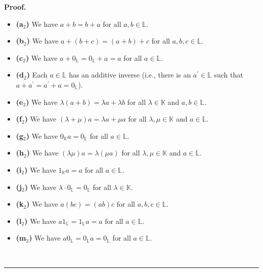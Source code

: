 \documentclass[numbers=enddot,12pt,final,onecolumn,notitlepage]{scrartcl}%
\theoremstyle{definition}
\newenvironment{fineprint}{\begin{small}}{\end{small}}
\newenvironment{proof}[1][Proof]{\noindent\textbf{#1.} }{\ \rule{0.5em}{0.5em}}
\begin{document}
\begin{fineprint}
\begin{proof}
\begin{itemize}
\item \textbf{(a}$_{2}$\textbf{)} We have $a+b=b+a$ for all $a,b\in\mathbb{L}$.

\item \textbf{(b}$_{2}$\textbf{)} We have $a+\left(  b+c\right)  =\left(
a+b\right)  +c$ for all $a,b,c\in\mathbb{L}$.

\item \textbf{(c}$_{2}$\textbf{)} We have $a+0_{\mathbb{L}}=0_{\mathbb{L}%
}+a=a$ for all $a\in\mathbb{L}$.

\item \textbf{(d}$_{2}$\textbf{)} Each $a\in\mathbb{L}$ has an additive
inverse (i.e., there is an $a^{\prime}\in\mathbb{L}$ such that $a+a^{\prime
}=a^{\prime}+a=0_{\mathbb{L}}$).

\item \textbf{(e}$_{2}$\textbf{)} We have $\lambda\left(  a+b\right)  =\lambda
a+\lambda b$ for all $\lambda\in\mathbb{K}$ and $a,b\in\mathbb{L}$.

\item \textbf{(f}$_{2}$\textbf{)} We have $\left(  \lambda+\mu\right)
a=\lambda a+\mu a$ for all $\lambda,\mu\in\mathbb{K}$ and $a\in\mathbb{L}$.

\item \textbf{(g}$_{2}$\textbf{)} We have $0_{\mathbb{K}}a=0_{\mathbb{L}}$ for
all $a\in\mathbb{L}$.

\item \textbf{(h}$_{2}$\textbf{)} We have $\left(  \lambda\mu\right)
a=\lambda\left(  \mu a\right)  $ for all $\lambda,\mu\in\mathbb{K}$ and
$a\in\mathbb{L}$.

\item \textbf{(i}$_{2}$\textbf{)} We have $1_{\mathbb{K}}a=a$ for all
$a\in\mathbb{L}$.

\item \textbf{(j}$_{2}$\textbf{)} We have $\lambda\cdot0_{\mathbb{L}%
}=0_{\mathbb{L}}$ for all $\lambda\in\mathbb{K}$.

\item \textbf{(k}$_{2}$\textbf{)} We have $a\left(  bc\right)  =\left(
ab\right)  c$ for all $a,b,c\in\mathbb{L}$.

\item \textbf{(l}$_{2}$\textbf{)} We have $a1_{\mathbb{L}}=1_{\mathbb{L}}a=a$
for all $a\in\mathbb{L}$.

\item \textbf{(m}$_{2}$\textbf{)} We have $a0_{\mathbb{L}}=0_{\mathbb{L}%
}a=0_{\mathbb{L}}$ for all $a\in\mathbb{L}$.


\end{itemize}
\end{proof}
\end{fineprint}
\end{document}
